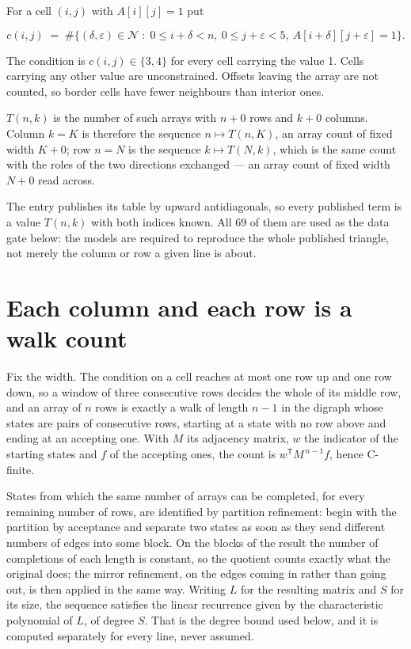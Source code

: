 \documentclass[11pt]{article}
\theoremstyle{definition}
\begin{document}
For a cell $(i,j)$ with $A[i][j] = 1$ put

\[c(i,j) \;=\; \#\bigl\{(\delta,\varepsilon)\in\mathcal{N} \;:\; 0\le i+\delta<n,\ 0\le j+\varepsilon<5,\ A[i+\delta][j+\varepsilon] = 1\bigr\}.\]

The condition is $c(i,j) \in \{3, 4\}$ for every cell carrying the value 1. Cells carrying any other value are unconstrained. Offsets leaving the array are not counted, so border cells have fewer neighbours than interior ones.

$T(n,k)$ is the number of such arrays with $n + 0$ rows and $k + 0$ columns. Column $k = K$ is therefore the sequence $n \mapsto T(n,K)$, an array count of fixed width $K + 0$; row $n = N$ is the sequence $k \mapsto T(N,k)$, which is the same count with the roles of the two directions exchanged --- an array count of fixed width $N + 0$ read across.

The entry publishes its table by upward antidiagonals, so every published term is a value $T(n,k)$ with both indices known. All 69 of them are used as the data gate below: the models are required to reproduce the whole published triangle, not merely the column or row a given line is about.

\section{Each column and each row is a walk count}

Fix the width. The condition on a cell reaches at most one row up and one row down, so a window of three consecutive rows decides the whole of its middle row, and an array of $n$ rows is exactly a walk of length $n-1$ in the digraph whose states are pairs of consecutive rows, starting at a state with no row above and ending at an accepting one. With $M$ its adjacency matrix, $w$ the indicator of the starting states and $f$ of the accepting ones, the count is $w^{\mathsf T}M^{\,n-1}f$, hence C-finite.

States from which the same number of arrays can be completed, for every remaining number of rows, are identified by partition refinement: begin with the partition by acceptance and separate two states as soon as they send different numbers of edges into some block. On the blocks of the result the number of completions of each length is constant, so the quotient counts exactly what the original does; the mirror refinement, on the edges coming in rather than going out, is then applied in the same way. Writing $L$ for the resulting matrix and $S$ for its size, the sequence satisfies the linear recurrence given by the characteristic polynomial of $L$, of degree $S$. That is the degree bound used below, and it is computed separately for every line, never assumed.
\end{document}
